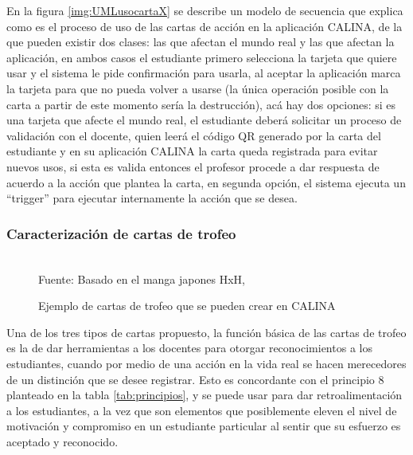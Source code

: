 En la figura \ref{img:UMLusocartaX} se describe un modelo de secuencia que explica como es el proceso de uso 
de las cartas de acción en la aplicación CALINA, de la que pueden existir dos clases: las que afectan el mundo 
real y las que afectan la aplicación, en ambos casos el estudiante primero selecciona la tarjeta que quiere 
usar y el sistema le pide confirmación para usarla, al aceptar la aplicación marca la tarjeta para que no 
pueda volver a usarse (la única operación posible con la carta a partir de este momento sería la destrucción), 
acá hay dos opciones: si es una tarjeta que afecte el mundo real, el estudiante deberá solicitar un proceso de 
validación con el docente, quien leerá el código QR generado por la carta del estudiante y en su aplicación 
CALINA la carta queda registrada para evitar nuevos usos, si esta es valida entonces el profesor procede a dar 
respuesta de acuerdo a la acción que plantea la carta, en segunda opción, el sistema ejecuta un ``trigger'' 
para ejecutar internamente la acción que se desea.

\subsubsection{Caracterización de cartas de trofeo}

\begin{figure}[!htb]
\caption{Ejemplo de cartas de trofeo que se pueden crear en CALINA}
\label{img:modelodecartastrofeo}
\centering
\begin{adjustbox}{width=12cm}
\end{adjustbox}
\\
{\footnotesize Fuente: Basado en el manga japones HxH, }
\end{figure}

Una de los tres tipos de cartas propuesto, la función básica de las cartas de trofeo es la de dar herramientas 
a los docentes para otorgar reconocimientos a los estudiantes, cuando por medio de una acción en la vida real 
se hacen merecedores de un distinción que se desee registrar. Esto es concordante con el principio 8 planteado 
en la tabla \ref{tab:principios}, y se puede usar para dar retroalimentación a los estudiantes, a la vez que 
son elementos que posiblemente eleven el nivel de motivación y compromiso en un estudiante particular al 
sentir que su esfuerzo es aceptado y reconocido.

